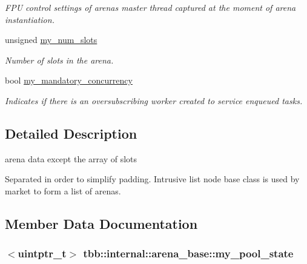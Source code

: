 \begin{DoxyCompactItemize}
\begin{DoxyCompactList}\small\item\em F\+P\+U control settings of arena\textquotesingle{}s master thread captured at the moment of arena instantiation. \end{DoxyCompactList}\item 
\hypertarget{structtbb_1_1internal_1_1arena__base_a7770213e3c679d92756b791cccb84e35}{}unsigned \hyperlink{structtbb_1_1internal_1_1arena__base_a7770213e3c679d92756b791cccb84e35}{my\+\_\+num\+\_\+slots}\label{structtbb_1_1internal_1_1arena__base_a7770213e3c679d92756b791cccb84e35}

\begin{DoxyCompactList}\small\item\em Number of slots in the arena. \end{DoxyCompactList}\item 
\hypertarget{structtbb_1_1internal_1_1arena__base_ae434159677617280df2f182c8ffe16ac}{}bool \hyperlink{structtbb_1_1internal_1_1arena__base_ae434159677617280df2f182c8ffe16ac}{my\+\_\+mandatory\+\_\+concurrency}\label{structtbb_1_1internal_1_1arena__base_ae434159677617280df2f182c8ffe16ac}

\begin{DoxyCompactList}\small\item\em Indicates if there is an oversubscribing worker created to service enqueued tasks. \end{DoxyCompactList}\end{DoxyCompactItemize}


\subsection{Detailed Description}
arena data except the array of slots 

Separated in order to simplify padding. Intrusive list node base class is used by market to form a list of arenas. 

\subsection{Member Data Documentation}
\hypertarget{structtbb_1_1internal_1_1arena__base_a4a62e36b7d674c0023897118be16498d}{}
\subsubsection[{my\+\_\+pool\+\_\+state}]{$<$uintptr\+\_\+t$>$ tbb\+::internal\+::arena\+\_\+base\+::my\+\_\+pool\+\_\+state}\label{structtbb_1_1internal_1_1arena__base_a4a62e36b7d674c0023897118be16498d}


